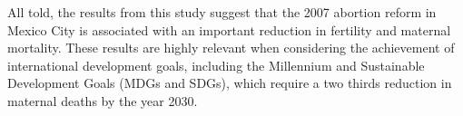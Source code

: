 \documentclass[a4paper, 11pt]{article}
\begin{document}
\begin{spacing}{2}
All told, the results from this study suggest that the 2007 abortion reform in Mexico City is associated with an important reduction in fertility and maternal mortality. These results are highly relevant when considering the achievement of international development goals, including the Millennium and Sustainable Development Goals (MDGs and SDGs), which require a two thirds reduction in maternal deaths by the year 2030.




\end{spacing}
\end{document}
